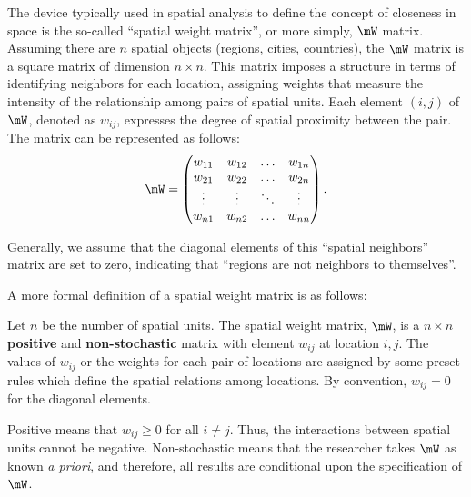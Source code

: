 \documentclass[english,12pt]{book}\usepackage[]{graphicx}\usepackage[]{xcolor}
\begin{document}
The device typically used in spatial analysis to define the concept of closeness in space is the so-called ``spatial weight matrix'', or more simply, $\mW$ matrix. Assuming there are $n$ spatial objects (regions, cities, countries), the $\mW$ matrix is a square matrix of dimension $n \times n$. This matrix imposes a structure in terms of identifying neighbors for each location, assigning weights that measure the intensity of the relationship among pairs of spatial units. Each element $(i,j)$ of $\mW$, denoted as $w_{ij}$, expresses the degree of spatial proximity between the pair. The matrix can be represented as follows:
\begin{equation*}
\mW = \begin{pmatrix}
        w_{11} & w_{12} & \hdots & w_{1n} \\ 
        w_{21} & w_{22} & \hdots & w_{2n} \\
        \vdots & \vdots & \ddots & \vdots \\
        w_{n1} & w_{n2} & \hdots & w_{nn} 
      \end{pmatrix}.
\end{equation*}

Generally, we assume that the diagonal elements of this ``spatial neighbors'' matrix are set to zero, indicating that ``regions are not neighbors to themselves''.

A more formal definition of a spatial weight matrix is as follows:

\begin{definition}\label{def:W}
  Let $n$ be the number of spatial units. The spatial weight matrix, $\mW$, is a $n\times n$ \textbf{positive} and \textbf{non-stochastic} matrix with element $w_{ij}$ at location $i,j$. The values of $w_{ij}$ or the weights for each pair of locations are assigned by some preset rules which define the spatial relations among locations. By convention, $w_{ij} = 0$ for the diagonal elements.
\end{definition}

Positive means that $w_{ij}\geq 0$ for all $i\neq j$. Thus, the interactions between spatial units cannot be negative. Non-stochastic means that the researcher takes $\mW$ as known \emph{a priori}, and therefore, all results are conditional upon the specification of $\mW$.
\end{document}
